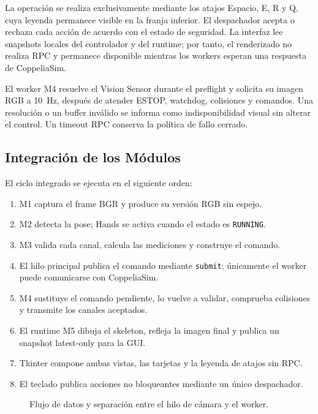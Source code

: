 La operación se realiza exclusivamente mediante los atajos Espacio, E, R y Q,
cuya leyenda permanece visible en la franja inferior. El despachador acepta o
rechaza cada acción de acuerdo con el estado de seguridad. La interfaz lee
snapshots locales del controlador y del runtime; por tanto, el renderizado no
realiza RPC y permanece disponible mientras los workers esperan una respuesta
de CoppeliaSim.

El worker M4 resuelve el Vision Sensor durante el preflight y solicita su imagen
RGB a 10~Hz, después de atender ESTOP, watchdog, colisiones y comandos. Una
resolución o un buffer inválido se informa como indisponibilidad visual sin
alterar el control. Un timeout RPC conserva la política de fallo cerrado.

\subsection{Integración de los Módulos}
\label{subsec:integracion_modulos}

El ciclo integrado se ejecuta en el siguiente orden:

\begin{enumerate}
    \item M1 captura el frame BGR y produce su versión RGB sin espejo.
    \item M2 detecta la pose; Hands se activa cuando el estado es
    \texttt{RUNNING}.
    \item M3 valida cada canal, calcula las mediciones y construye el comando.
    \item El hilo principal publica el comando mediante \texttt{submit};
    únicamente el worker puede comunicarse con CoppeliaSim.
    \item M4 sustituye el comando pendiente, lo vuelve a validar, comprueba
    colisiones y transmite los canales aceptados.
    \item El runtime M5 dibuja el skeleton, refleja la imagen final y publica
          un snapshot latest-only para la GUI.
    \item Tkinter compone ambas vistas, las tarjetas y la leyenda de atajos sin RPC.
    \item El teclado publica acciones no bloqueantes mediante un único despachador.
\end{enumerate}

\begin{figure}[H]
    \centering
    \caption{Flujo de datos y separación entre el hilo de cámara y el worker.}
    \label{fig:flujo_integracion}
\end{figure}


